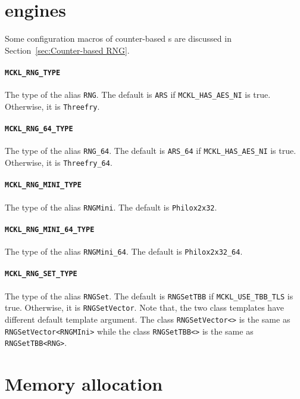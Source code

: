 \section{\protect\rng engines}
\label{sec:RNG engines}

Some configuration macros of counter-based \rng{}s are discussed in
Section~\ref{sec:Counter-based RNG}.

\paragraph{\texttt{MCKL\_RNG\_TYPE}} The type of the alias \verb|RNG|. The
default is \verb|ARS| if \verb|MCKL_HAS_AES_NI| is true. Otherwise, it is
\verb|Threefry|.

\paragraph{\texttt{MCKL\_RNG\_64\_TYPE}} The type of the alias \verb|RNG_64|.
The default is \verb|ARS_64| if \verb|MCKL_HAS_AES_NI| is true. Otherwise, it
is \verb|Threefry_64|.

\paragraph{\texttt{MCKL\_RNG\_MINI\_TYPE}} The type of the alias
\verb|RNGMini|.  The default is \verb|Philox2x32|.

\paragraph{\texttt{MCKL\_RNG\_MINI\_64\_TYPE}} The type of the alias
\verb|RNGMini_64|. The default is \verb|Philox2x32_64|.

\paragraph{\texttt{MCKL\_RNG\_SET\_TYPE}} The type of the alias \verb|RNGSet|.
The default is \verb|RNGSetTBB| if \verb|MCKL_USE_TBB_TLS| is true. Otherwise,
it is \verb|RNGSetVector|. Note that, the two class templates have different
default template argument. The class \verb|RNGSetVector<>| is the same as
\verb|RNGSetVector<RNGMIni>| while the class \verb|RNGSetTBB<>| is the same as
\verb|RNGSetTBB<RNG>|.

\section{Memory allocation}
\label{sec:Memory allocation}

